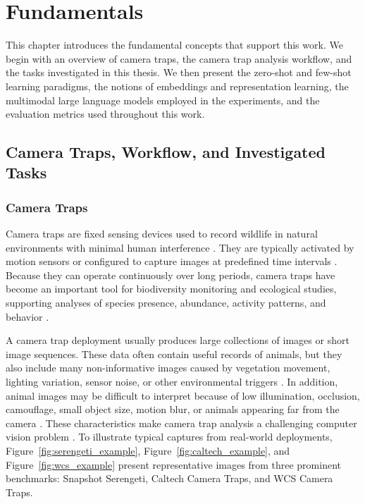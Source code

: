 \chapter{Fundamentals}\label{cap:fundamentals} 

This chapter introduces the fundamental concepts that support this work. We begin with an overview of camera traps, the camera trap analysis workflow, and the tasks investigated in this thesis. We then present the zero-shot and few-shot learning paradigms, the notions of embeddings and representation learning, the multimodal large language models employed in the experiments, and the evaluation metrics used throughout this work.

\section{Camera Traps, Workflow, and Investigated Tasks}
\label{sec:camera-traps-workflow}

\subsection{Camera Traps}


Camera traps are fixed sensing devices used to record wildlife in natural environments with minimal human interference \cite{burton2015wildlife}. They are typically activated by motion sensors or configured to capture images at predefined time intervals \cite{swann2011evaluating}. Because they can operate continuously over long periods, camera traps have become an important tool for biodiversity monitoring and ecological studies, supporting analyses of species presence, abundance, activity patterns, and behavior \cite{bruce2025large, tuia2022perspectives}.


A camera trap deployment usually produces large collections of images or short image sequences. These data often contain useful records of animals, but they also include many non-informative images caused by vegetation movement, lighting variation, sensor noise, or other environmental triggers \cite{beery2018recognition}. In addition, animal images may be difficult to interpret because of low illumination, occlusion, camouflage, small object size, motion blur, or animals appearing far from the camera \cite{schneider2020three}. These characteristics make camera trap analysis a challenging computer vision problem \cite{beery2023wild}. To illustrate typical captures from real-world deployments, Figure~\ref{fig:serengeti_example}, Figure~\ref{fig:caltech_example}, and Figure~\ref{fig:wcs_example} present representative images from three prominent benchmarks: Snapshot Serengeti, Caltech Camera Traps, and WCS Camera Traps.



